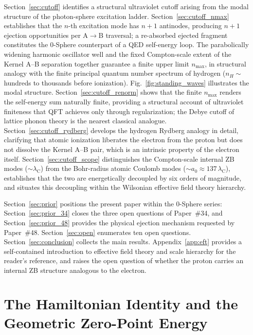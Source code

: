 \documentclass[%
 reprint, amsmath,amssymb, aps, prb, ]{revtex4-2}
\numberwithin{equation}{section}
\newcommand{\lambdaC}{\lambda_{\mathrm{C}}}
\begin{document}
Section~\ref{sec:cutoff} identifies a structural ultraviolet cutoff arising from the modal structure of the photon-sphere excitation ladder.
Section~\ref{sec:cutoff_nmax} establishes that the $n$-th excitation mode has $n+1$ antinodes, producing $n+1$ ejection opportunities per A$\to$B traversal; a re-absorbed ejected fragment constitutes the 0-Sphere counterpart of a QED self-energy loop. The parabolically widening harmonic oscillator well and the fixed Compton-scale extent of the Kernel A--B separation together guarantee a finite upper limit $n_{\max}$, in structural analogy with the finite principal quantum number spectrum of hydrogen ($n_H \sim$ hundreds to thousands before ionization). Fig.~\ref{fig:standing_waves} illustrates the modal structure.
Section~\ref{sec:cutoff_renorm} shows that the finite $n_{\max}$ renders the self-energy sum naturally finite, providing a structural account of ultraviolet finiteness that QFT achieves only through regularization; the Debye cutoff of lattice phonon theory is the nearest classical analogue.
Section~\ref{sec:cutoff_rydberg} develops the hydrogen Rydberg analogy in detail, clarifying that atomic ionization liberates the electron from the proton but does not dissolve the Kernel A--B pair, which is an intrinsic property of the electron itself.
Section~\ref{sec:cutoff_scope} distinguishes the Compton-scale internal ZB modes ($\sim\lambdaC$) from the Bohr-radius atomic Coulomb modes ($\sim a_0 \approx 137\,\lambdaC$), establishes that the two are energetically decoupled by six orders of magnitude, and situates this decoupling within the Wilsonian effective field theory hierarchy.

Section~\ref{sec:prior} positions the present paper within the 0-Sphere series:
Section~\ref{sec:prior_34} closes the three open questions of Paper~\#34, and
Section~\ref{sec:prior_48} provides the physical ejection mechanism requested by Paper~\#48.
Section~\ref{sec:open} enumerates ten open questions.
Section~\ref{sec:conclusion} collects the main results.
Appendix~\ref{app:eft} provides a self-contained introduction to effective field theory and scale hierarchy for the reader's reference, and raises the open question of whether the proton carries an internal ZB structure analogous to the electron.

\section{The Hamiltonian Identity and the Geometric Zero-Point Energy}
\label{sec:zpe}
\end{document}
